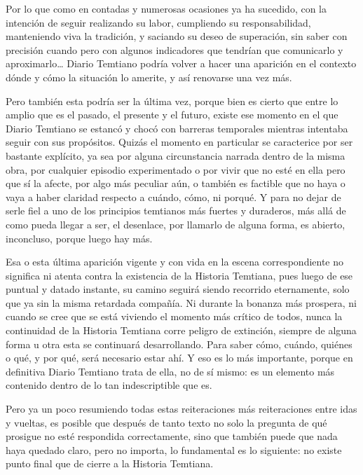 \documentclass[
  spanish,
]{book}
\begin{document}
Por lo que como en contadas y numerosas ocasiones ya ha sucedido, con la intención de seguir realizando su labor, cumpliendo su responsabilidad, manteniendo viva la tradición, y saciando su deseo de superación, sin saber con precisión cuando pero con algunos indicadores que tendrían que comunicarlo y aproximarlo\ldots{} Diario Temtiano podría volver a hacer una aparición en el contexto dónde y cómo la situación lo amerite, y así renovarse una vez más.

Pero también esta podría ser la última vez, porque bien es cierto que entre lo amplio que es el pasado, el presente y el futuro, existe ese momento en el que Diario Temtiano se estancó y chocó con barreras temporales mientras intentaba seguir con sus propósitos. Quizás el momento en particular se caracterice por ser bastante explícito, ya sea por alguna circunstancia narrada dentro de la misma obra, por cualquier episodio experimentado o por vivir que no esté en ella pero que sí la afecte, por algo más peculiar aún, o también es factible que no haya o vaya a haber claridad respecto a cuándo, cómo, ni porqué. Y para no dejar de serle fiel a uno de los principios temtianos más fuertes y duraderos, más allá de como pueda llegar a ser, el desenlace, por llamarlo de alguna forma, es abierto, inconcluso, porque luego hay más.

Esa o esta última aparición vigente y con vida en la escena correspondiente no significa ni atenta contra la existencia de la Historia Temtiana, pues luego de ese puntual y datado instante, su camino seguirá siendo recorrido eternamente, solo que ya sin la misma retardada compañía. Ni durante la bonanza más prospera, ni cuando se cree que se está viviendo el momento más crítico de todos, nunca la continuidad de la Historia Temtiana corre peligro de extinción, siempre de alguna forma u otra esta se continuará desarrollando. Para saber cómo, cuándo, quiénes o qué, y por qué, será necesario estar ahí. Y eso es lo más importante, porque en definitiva Diario Temtiano trata de ella, no de sí mismo: es un elemento más contenido dentro de lo tan indescriptible que es.

Pero ya un poco resumiendo todas estas reiteraciones más reiteraciones entre idas y vueltas, es posible que después de tanto texto no solo la pregunta de qué prosigue no esté respondida correctamente, sino que también puede que nada haya quedado claro, pero no importa, lo fundamental es lo siguiente: no existe punto final que de cierre a la Historia Temtiana.
\end{document}
